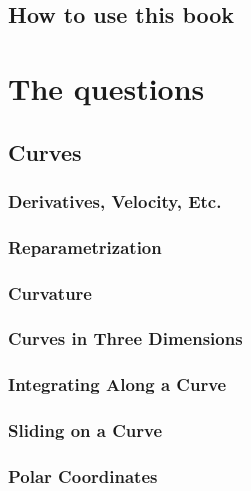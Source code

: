 \documentclass[12pt,letterpaper, openany]{book}
\begin{document}
\frontmatter

\chapter{How to use this book}


\tableofcontents

\mainmatter

\part{The questions}


\chapter{Curves}
\section{Derivatives, Velocity, Etc.}

\section{Reparametrization}

\section{Curvature}

\section{Curves in Three Dimensions}

\setcounter{section}{5}
%
\section{Integrating Along a Curve}

\section{Sliding on a Curve}

\section{Polar Coordinates}

%
\end{document}
